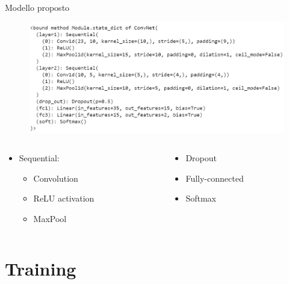 \documentclass[xcolor=x11names,compress, 
]{beamer}
\theoremstyle{definition} \newtheorem{esempio}{Esempio}
\theoremstyle{definition}
\begin{document}
		\begin{frame}{Modello proposto}
			\begin{figure}
				\includegraphics[width=1\textwidth]{immagini/ourcnn}
			\end{figure}\pause
			\begin{columns}
				\begin{column}{0.5\textwidth}
					\begin{itemize}
						\item Sequential:\pause
						\begin{itemize}
							\item Convolution\pause
							\item ReLU activation\pause
							\item MaxPool\pause
						\end{itemize}
					\end{itemize}
				\end{column}
				\begin{column}{0.5\textwidth}
					\begin{itemize}
						\item Dropout\pause
						\item Fully-connected\pause
						\item Softmax
					\end{itemize}
				\end{column}
			\end{columns}
		\end{frame}
		
\section{Training}
\end{document}
